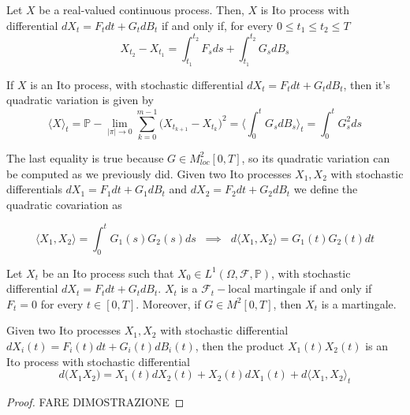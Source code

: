 \begin{proposition}
    Let $X$ be a real-valued continuous process. Then, $X$ is Ito process with differential $dX_t = F_t dt + G_t dB_t$ if and only if, for every $0 \leq t_1 \leq t_2 \leq T$
    \begin{equation*}
        X_{t_2}-X_{t_1} = \int_{t_1}^{t_2} F_s ds + \int_{t_1}^{t_2} G_s dB_s
    \end{equation*}
\end{proposition}

\begin{theorem}
    If $X$ is an Ito process, with stochastic differential $dX_t = F_t dt+G_t dB_t$, then it's quadratic variation is given by 
    \begin{equation*}
        \langle X \rangle_t = \mathbb{P}-\lim_{\vert \pi \vert \to 0} \sum_{k=0}^{m-1} \big( X_{t_{k+1}}-X_{t_k} \big)^2 = \Big\langle \int_0^t G_s dB_s \Big\rangle_t = \int_0^t G_s^2 ds
    \end{equation*}
\end{theorem}

The last equality is true because $G \in M^2_{loc}[0,T]$, so its quadratic variation can be computed as we previously did.
Given two Ito processes $X_1,X_2$ with stochastic differentials $dX_1 = F_1dt+G_1dB_t$ and $dX_2 = F_2dt+G_2dB_t$ we define the quadratic covariation as 

\begin{equation*}
    \langle X_1,X_2 \rangle = \int_0^t G_1(s) G_2(s) ds \;\; \implies \;\; d\langle X_1, X_2 \rangle = G_1(t) G_2(t) dt 
\end{equation*}

\begin{theorem}
    Let $X_t$ be an Ito process such that $X_0 \in L^1(\Omega, \mathcal{F}, \mathbb{P})$, with stochastic differential $dX_t = F_t dt + G_t dB_t$. $X_t$ is a $\mathcal{F}_t-$local martingale if and only if $F_t = 0$ for every $t \in [0,T]$. Moreover, if $G \in M^2[0,T]$, then $X_t$ is a martingale.
\end{theorem}

\begin{theorem}
    Given two Ito processes $X_1,X_2$ with stochastic differential $dX_i(t) = F_i(t)dt+G_i(t)dB_i(t)$, then the product $X_1(t) X_2(t)$ is an Ito process with stochastic differential 
    \begin{equation}
        d\big(X_1 X_2\big) = X_1(t) dX_2(t) + X_2(t) dX_1(t) + d\langle X_1, X_2 \rangle_t
    \end{equation}
\end{theorem}
\begin{proof}
    FARE DIMOSTRAZIONE
\end{proof}


